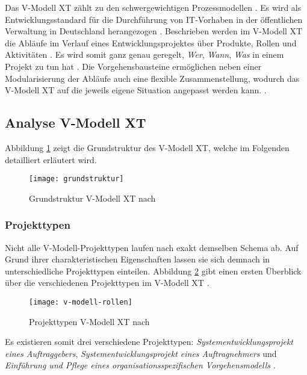 Das V-Modell XT zählt zu den schwergewichtigen Prozessmodellen \cite{Hanser2010}. Es wird als Entwicklungsstandard für die Durchführung von IT-Vorhaben in der öffentlichen Verwaltung in Deutschland herangezogen \cite{Kuhrmann2011}. Beschrieben werden im V-Modell XT die Abläufe im Verlauf eines Entwicklungsprojektes über Produkte, Rollen und Aktivitäten \cite{Friedrich2008}. Es wird somit ganz genau geregelt, \textit{Wer}, \textit{Wann}, \textit{Was} in einem Projekt zu tun hat \cite{2004vmodell}. Die Vorgehensbausteine ermöglichen neben einer Modularisierung der Abläufe auch eine flexible Zusammenstellung, wodurch das V-Modell XT auf die jeweils eigene Situation angepasst werden kann. \cite{Friedrich2008,Zoerner2012}. \newline
\subsection{Analyse V-Modell XT}

Abbildung \ref{fig:grundstruktur} zeigt die Grundstruktur des V-Modell XT, welche im Folgenden detailliert erläutert wird.
\begin{figure}[htp]
\begin{center}
  \texttt{[image: grundstruktur]} %
  \caption{Grundstruktur V-Modell XT nach \cite{2004vmodell}}
  \label{fig:grundstruktur}
\end{center}
\end{figure}

\subsubsection{Projekttypen}
Nicht alle V-Modell-Projekttypen laufen nach exakt demselben Schema ab. Auf Grund ihrer charakteristischen Eigenschaften lassen sie sich demnach in unterschiedliche Projekttypen einteilen. Abbildung \ref{fig:Projekttypen} gibt einen ersten Überblick über die verschiedenen Projekttypen im V-Modell XT \cite{2004vmodell}.
\begin{figure}[htp]
\begin{center}
  \texttt{[image: v-modell-rollen]} %
  \caption{Projekttypen V-Modell XT nach \cite{2004vmodell}}
  \label{fig:Projekttypen}
\end{center}
\end{figure}

Es existieren somit drei verschiedene Projekttypen: \textit{Systementwicklungsprojekt eines Auftraggebers}, \textit{Systementwicklungsprojekt eines Auftragnehmers} und \textit{Einführung und Pflege eines organisationsspezifischen Vorgehensmodells} \cite{reinhard2008}. \newline

